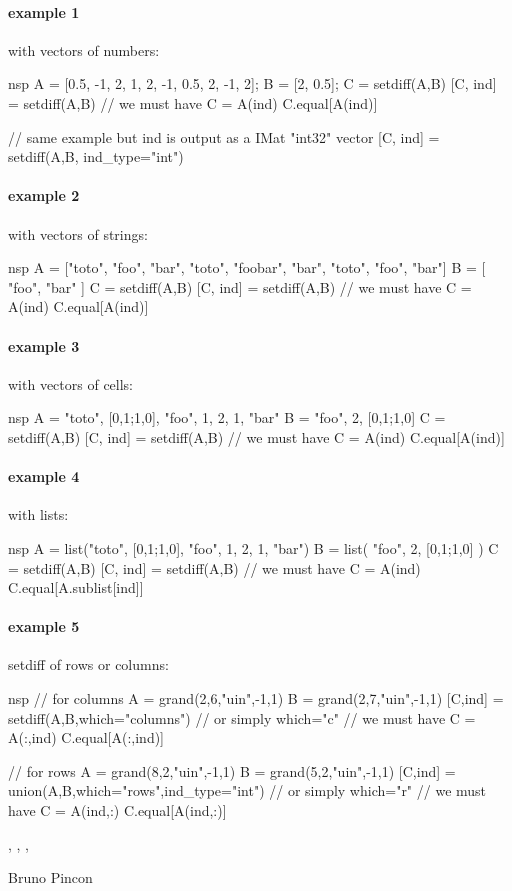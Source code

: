 \begin{examples}

\paragraph{example 1} with vectors of numbers:
\begin{mintednsp}{nsp}
A = [0.5, -1, 2, 1, 2, -1, 0.5, 2, -1, 2];
B = [2, 0.5];
C = setdiff(A,B)
[C, ind] = setdiff(A,B)
// we must have C = A(ind)
C.equal[A(ind)]

// same example but ind is output as a IMat "int32" vector
[C, ind] = setdiff(A,B, ind_type="int")
\end{mintednsp}

\paragraph{example 2} with vectors of strings:
\begin{mintednsp}{nsp}
A = ["toto", "foo", "bar", "toto", "foobar", "bar", "toto", "foo", "bar"]
B = [ "foo", "bar" ]
C = setdiff(A,B)
[C, ind] = setdiff(A,B)
// we must have C = A(ind)
C.equal[A(ind)]
\end{mintednsp}

\paragraph{example 3} with vectors of cells:
\begin{mintednsp}{nsp}
A = {"toto", [0,1;1,0], "foo", 1, 2, 1, "bar"}
B = { "foo", 2,  [0,1;1,0] }
C = setdiff(A,B)
[C, ind] = setdiff(A,B)
// we must have C = A(ind)
C.equal[A(ind)]
\end{mintednsp}

\paragraph{example 4} with lists:
\begin{mintednsp}{nsp}
A = list("toto", [0,1;1,0], "foo", 1, 2, 1, "bar")
B = list( "foo", 2,  [0,1;1,0] )
C = setdiff(A,B)
[C, ind] = setdiff(A,B)
// we must have C = A(ind)
C.equal[A.sublist[ind]]
\end{mintednsp}

\paragraph{example 5} setdiff of rows or columns:
\begin{mintednsp}{nsp}
// for columns
A = grand(2,6,"uin",-1,1)
B = grand(2,7,"uin",-1,1)
[C,ind] = setdiff(A,B,which="columns")  // or simply which="c"
// we must have C = A(:,ind)
C.equal[A(:,ind)]

// for rows
A = grand(8,2,"uin",-1,1)
B = grand(5,2,"uin",-1,1)
[C,ind] = union(A,B,which="rows",ind_type="int")  // or simply which="r"
// we must have C = A(ind,:)
C.equal[A(ind,:)]
\end{mintednsp}

\end{examples}

\begin{manseealso}
  , , ,   
\end{manseealso}

\begin{authors}
  Bruno Pincon
\end{authors}

